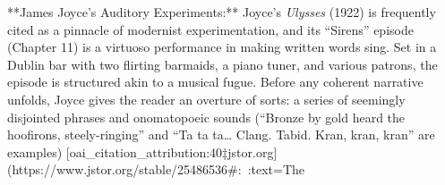 \documentclass[12pt]{report}
\begin{document}
**James Joyce’s Auditory Experiments:** Joyce’s \textit{Ulysses} (1922) is frequently cited as a pinnacle of modernist experimentation, and its “Sirens” episode (Chapter 11) is a virtuoso performance in making written words sing. Set in a Dublin bar with two flirting barmaids, a piano tuner, and various patrons, the episode is structured akin to a musical fugue. Before any coherent narrative unfolds, Joyce gives the reader an overture of sorts: a series of seemingly disjointed phrases and onomatopoeic sounds (“Bronze by gold heard the hoofirons, steely-ringing” and “Ta ta ta… Clang.  Tabid.  Kran, kran, kran” are examples) [oai_citation_attribution:40‡jstor.org](https://www.jstor.org/stable/25486536#:~:text=The%
\end{document}
